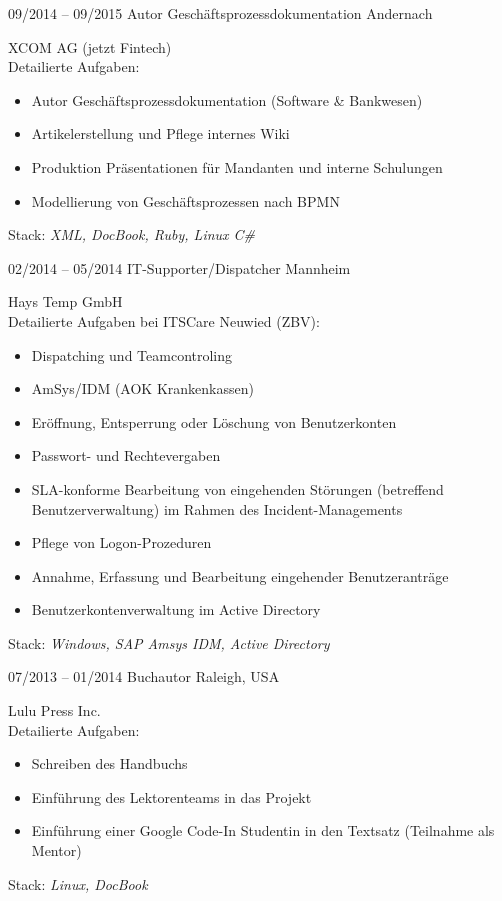 \documentclass[a4paper]{friggeri-cv} %
\begin{document}
\begin{entrylist}
\entry
{09/2014 -- 09/2015}
{Autor Geschäftsprozessdokumentation}
{Andernach}
{XCOM AG (jetzt Fintech) \\
	Detailierte Aufgaben:
	\begin{itemize}
		\item Autor Geschäftsprozessdokumentation (Software \& Bankwesen)
		\item Artikelerstellung und Pflege internes Wiki
		\item Produktion Präsentationen für Mandanten und interne Schulungen
		\item Modellierung von Geschäftsprozessen nach BPMN
	\end{itemize}
	Stack: \textit{XML, DocBook, Ruby, Linux C\#}
}
\entry
{02/2014 -- 05/2014}
{IT-Supporter/Dispatcher}
{Mannheim}
{Hays Temp GmbH \\
    Detailierte Aufgaben bei ITSCare Neuwied (ZBV):
    \begin{itemize}
        \item Dispatching und Teamcontroling
        \item AmSys/IDM (AOK Krankenkassen)
        \item Eröffnung, Entsperrung oder Löschung von Benutzerkonten
        \item Passwort- und Rechtevergaben
        \item SLA-konforme Bearbeitung von eingehenden Störungen (betreffend Benutzerverwaltung) im Rahmen des Incident-Managements
        \item Pflege von Logon-Prozeduren
        \item Annahme, Erfassung und Bearbeitung eingehender Benutzeranträge
        \item Benutzerkontenverwaltung im Active Directory
    \end{itemize}
		Stack: \textit{Windows, SAP Amsys IDM, Active Directory}
}
\entry
{07/2013 -- 01/2014}
{Buchautor}
{Raleigh, USA}
{Lulu Press Inc.\\
    Detailierte Aufgaben:
    \begin{itemize}
        \item Schreiben des Handbuchs
        \item Einführung des Lektorenteams in das Projekt
        \item Einführung einer Google Code-In Studentin in den Textsatz (Teilnahme als Mentor)
    \end{itemize}
		Stack: \textit{Linux, DocBook}
}
\end{entrylist}
\end{document}

